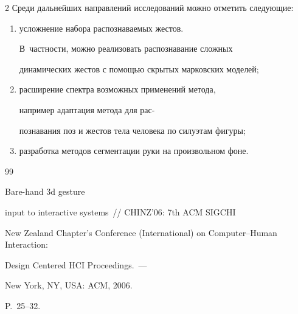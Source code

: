 \begin{multicols}{2}
Среди дальнейших направлений исследований можно отметить следующие:


\begin{enumerate}[(1)]


\item  усложнение набора распознаваемых жес\-тов.


В~част\-ности, мож\-но реализовать распознавание слож\-ных 


динамических жес\-тов с помощью скрытых марковских моделей;


\item расширение спектра возможных применений метода, 


например адаптация метода для рас-\linebreak\vspace*{-12pt}


\columnbreak





\noindent


познавания поз и жестов тела человека по силуэтам фигуры;


\item разработка методов сегментации руки на произвольном фоне.


\end{enumerate}





{\small\frenchspacing


{%




\begin{thebibliography}{99}









Bare-hand 3d gesture


  input to interactive systems~// CHINZ'06: 7th ACM SIGCHI


  New Zealand Chapter's  Conference (International) on Computer--Human Interaction:


  Design Centered HCI Proceedings.~---


New York, NY, USA: ACM, 2006.


P.~25--32.






\end{thebibliography}}}
\end{multicols}
